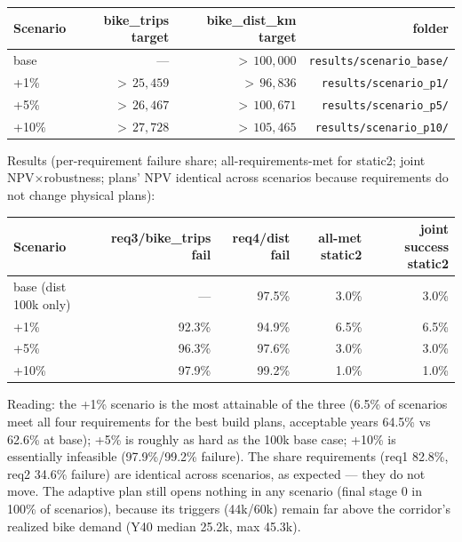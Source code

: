 \documentclass[10pt,a4paper]{article}
\begin{document}
\begin{center}\small\begin{tabular}{@{}lrrr@{}}
\toprule
Scenario & bike\_trips target & bike\_dist\_km target & folder \\
\midrule
base & --- & ${>}\,100{,}000$ & \texttt{results/scenario\_base/} \\
+1\%  & ${>}\,25{,}459$ & ${>}\,96{,}836$  & \texttt{results/scenario\_p1/} \\
+5\%  & ${>}\,26{,}467$ & ${>}\,100{,}671$ & \texttt{results/scenario\_p5/} \\
+10\% & ${>}\,27{,}728$ & ${>}\,105{,}465$ & \texttt{results/scenario\_p10/} \\
\bottomrule
\end{tabular}\end{center}

Results (per-requirement failure share; all-requirements-met for static2; joint
NPV$\times$robustness; plans' NPV identical across scenarios because requirements do not
change physical plans):

\begin{center}\small\begin{tabular}{@{}p{4.8cm}rrrr@{}}
\toprule
Scenario & req3/bike\_trips fail & req4/dist fail & all-met static2 & joint success static2 \\
\midrule
base (dist 100k only) & ---        & 97.5\% & 3.0\%  & 3.0\% \\
+1\%                    & 92.3\%     & 94.9\% & 6.5\%  & 6.5\% \\
+5\%                    & 96.3\%     & 97.6\% & 3.0\%  & 3.0\% \\
+10\%                   & 97.9\%     & 99.2\% & 1.0\%  & 1.0\% \\
\bottomrule
\end{tabular}\end{center}

Reading: the +1\% scenario is the most attainable of the three (6.5\% of scenarios meet
all four requirements for the best build plans, acceptable years 64.5\% vs 62.6\% at
base); +5\% is roughly as hard as the 100k base case; +10\% is essentially infeasible
(97.9\%/99.2\% failure). The share requirements (req1 82.8\%, req2 34.6\% failure) are
identical across scenarios, as expected --- they do not move. The adaptive plan still
opens nothing in any scenario (final stage 0 in 100\% of scenarios), because its
triggers (44k/60k) remain far above the corridor's realized bike demand (Y40 median
25.2k, max 45.3k).
\end{document}
